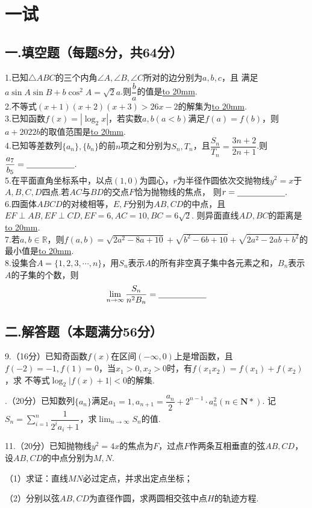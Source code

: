 \section*{一试}
\subsection*{一.填空题（每题8分，共64分）}

1.已知$\bigtriangleup ABC$的三个内角$\angle A,\angle B,\angle C$所对的边分别为$a,b,c$，且
满足$a\sin{A}\sin{B}+b\cos^2{A}=\sqrt{2}a$.则$\dfrac{b}{a}$的值是\underline{\hbox to 20mm{}}.
~\\

2.不等式$(x+1)(x+2)(x+3)>26x-2$的解集为\underline{\hbox to 20mm{}}.
~\\

3.已知函数$f(x)=|\log_2{x}|$，若实数$a,b(a<b)$满足$f(a)=f(b)$，则$a+2022b$的取值范围是\underline{\hbox to 20mm{}}.
~\\

4.已知等差数列$\{a_n\},\{b_n\}$的前$n$项之和分别为$S_n,T_n$，且$\dfrac{S_n}{T_n}=\dfrac{3n+2}{2n+1}$.则$\dfrac{a_7}{b_5}=\underline{\hbox to 20mm{}}.$
~\\

5.在平面直角坐标系中，以点$(1,0)$为圆心，$r$为半径作圆依次交抛物线$y^2=x$于$A,B,C,D$四点.若$AC$与$BD$的交点$F$恰为抛物线的焦点，
则$r=\underline{\hbox to 20mm{}}.$
~\\

6.四面体$ABCD$的对棱相等，$E,F$分别为$AB,CD$的中点，且$EF\perp AB,EF\perp CD,EF=6,AC=10,BC=6\sqrt{2}$.
则异面直线$AD,BC$的距离是\underline{\hbox to 20mm{}}.
~\\

7.若$a,b\in \mathbb{R}$，则$f(a,b)=\sqrt{2a^2-8a+10}+\sqrt{b^2-6b+10}+\sqrt{2a^2-2ab+b^2}$的最小值是\underline{\hbox to 20mm{}}.
~\\

8.设集合$A=\{1,2,3,\cdots,n\}$，用$S_n$表示$A$的所有非空真子集中各元素之和，$B_n$表示$A$的子集的个数，则
\[\lim_{n\to \infty }\dfrac{S_n}{n^2B_n}=\underline{\hbox to 20mm{}}\]

\subsection*{二.解答题（本题满分56分）}
9.（16分）已知奇函数$f(x)$在区间$(-\infty,0)$上是增函数，且$f(-2)=-1,f(1)=0$，当$x_1>0,x_2>0$时，有$f(x_1x_2)=f(x_1)+f(x_2)$，求
不等式$\log_2{|f(x)+1|}<0$的解集.

.（20分）已知数列$\{a_n\}$满足$a_1=1,a_{n+1}=\dfrac{a_n}{2}+2^{n-1}\cdot a_n^2(n\in \mathbf{N}*)$.
记$\displaystyle{S_n=\sum_{i=1}^n\dfrac{1}{2^ia_i+1}}$，求$\displaystyle{\lim_{n\to \infty}S_n}$的值.

\vspace{100mm}

11.（20分）已知抛物线$y^2=4x$的焦点为$F$，过点$F$作两条互相垂直的弦$AB,CD$，设$AB,CD$的中点分别为$M,N$.

（1）求证：直线$MN$必过定点，并求出定点坐标；

（2）分别以弦$AB,CD$为直径作圆，求两圆相交弦中点$H$的轨迹方程.